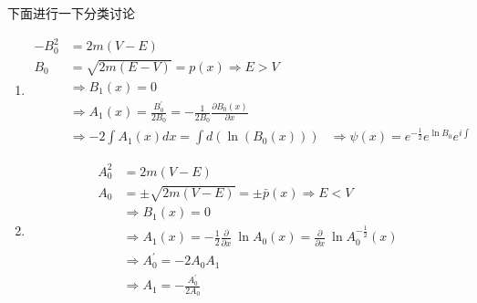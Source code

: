\documentclass{article}
\newcommand{\Da}[2]{\frac{\partial}{\partial#2}#1}
\begin{document}
下面进行一下分类讨论
\begin{enumerate}
	\item[$A_0=0$]
	      \begin{align*}
		      -B_0^2 & =2m(V-E)                                                                                     \\
		      B_0    & =\sqrt{2m(E-V)}=p(x)\Rightarrow E>V                                                          \\
		             & \Rightarrow B_1(x)=0                                                                         \\
		             & \Rightarrow A_1(x)=\frac{B^\prime_0}{2B_0}=-\frac{1}{2B_0}\frac{\partial B_0(x)}{\partial x} \\
		             & \Rightarrow -2\int A_1(x)dx=\int d(\ln(B_0(x)))
		             & \Rightarrow \psi(x)=e^{-\frac{1}{2}}e^{\ln B_0}e^{i\int}
	      \end{align*}
	\item[$B_0=0$]
	      \begin{align*}
		      A_0^2 & =2m(V-E)                                                                                                                                                                                                              \\
		      A_0   & =\pm\sqrt{2m(V-E)}=\pm\bar{p}(x)\Rightarrow E<V                                                                                                                                                                       \\
		            & \Rightarrow B_1(x)=0                                                                                                                                                                                                  \\
		            & \Rightarrow A_1(x)=-\frac{1}{2}\Da{~}{x}\ln A_0(x)=\Da{~}{x}\ln A_0^{-\frac{1}{2}}(x)                                                                                                                                 \\
		            & \Rightarrow A_0^\prime =-2A_0A_1                                                                                                                                                                                      \\
		            & \Rightarrow A_1=-\frac{A_0^\prime}{2A_0}                                                                                                                                                                              \\

\end{align*}
\end{enumerate}
\end{document}
